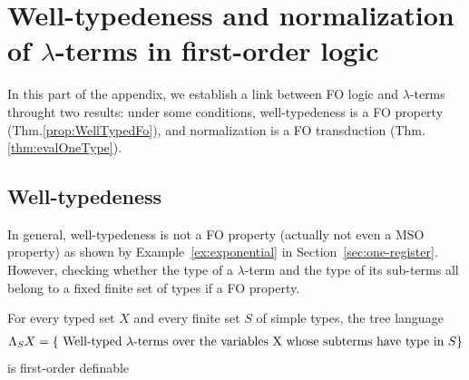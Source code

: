 \section{Well-typedeness and normalization of $\lambda$-terms in first-order logic}
\label{sec:eval}

\newcommand{\lambdaterm}{$\lambda$-term }
\newcommand{\lambdaterms}{$\lambda$-terms }

\newcommand{\NonLinTerms}[2]{\Lambda_{#1} #2}
\newcommand{\LinTerms}[2]{\mathsf{Lin}_{#1} #2}

 \newcommand{\rlambda}{\ranked{\Lambda}}
 \newcommand{\rlambdalin}{\ranked{\Lambda^{\sf{lin}}}}
 \newcommand{\rlambdathin}{\ranked{\Lambda^{\sf{thin}}}}


\newcommand{\thinterm}[1]{\ranked{\mathsf{Thin}_{#1}}}
In this part of the appendix, we establish a link between FO logic and $\lambda$-terms throught two results: under some conditions, well-typedeness is a FO property (Thm.\ref{prop:WellTypedFo}), and normalization is a FO transduction (Thm.\ref{thm:evalOneType}). 


\subsection{Well-typedeness}
In general, well-typedeness is not a FO property (actually not even a MSO property) as shown by Example~\ref{ex:exponential} in Section~\ref{sec:one-register}.
However, checking whether the type of a \lambdaterm and the type of its sub-terms all belong to a fixed finite set of types if a FO property. 

\begin{theorem}\label{prop:WellTypedFo}
    For every typed set $X$ and every finite set $S$ of simple types, the tree language 
    \begin{align*}
    \NonLinTerms S X = \set{ \text{ Well-typed \lambdaterms over the variables X whose subterms have type in $S$}}
    \end{align*}
    is first-order definable 
\end{theorem}

